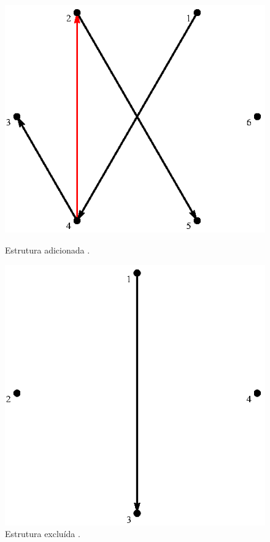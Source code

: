 \documentclass[12pt,a4paper]{article}
\begin{document}
\begin{figure}[htp]
\begin{minipage}[b]{0.5\linewidth}
\centering
\includegraphics[scale=1]{img/addStruct.eps}
\caption{Estrutura adicionada .}
\label{fig:addstruct}
\end{minipage}
\hspace{0.5cm}
\begin{minipage}[b]{0.5\linewidth}
\centering
\includegraphics[scale=1]{img/excStruct.eps}
\caption{Estrutura excluída .}
\label{fig:excstruct}
\end{minipage}
\end{figure}
\end{document}
